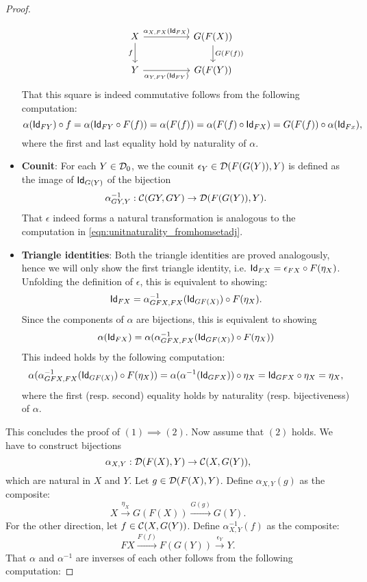 \begin{thm}
\begin{proof}
\begin{itemize}
\[
\begin{tikzcd}
X \arrow[rr, "{\alpha_{X,FX}(\Id[FX])}"] \arrow[d,swap, "f"] && G(F(X)) \arrow[d, "G(F(f))"] \\
Y \arrow[rr, swap, "{\alpha_{Y,FY}(\Id[FY])}"] && G(F(Y))
\end{tikzcd}
\]
That this square is indeed commutative follows from the following computation:
\begin{equation}\label{eqn:unitnaturality_fromhomsetadj}
\co{f}{\alpha(\Id[FY])} = \alpha(\co{F(f)}{\Id[FY]}) = \alpha(F(f)) =  \alpha(\co{\Id[FX]}{F(f)}) = \co{\alpha(\Id[Fx])}{G(F(f))},
\end{equation}
where the first and last equality hold by naturality of $\alpha$.
\item \textbf{Counit}: For each $Y\in\Ob{\DD}$, we the counit $\epsilon_Y \in \CHom{\DD}{F(G(Y))}{Y}$ is defined as the image of $\Id[G(Y)]$ of the bijection
\[
\alpha^{-1}_{GY,Y} : \CHom{\CC}{GY}{GY}\to \CHom{\DD}{F(G(Y))}{Y}.
\]
That $\epsilon$ indeed forms a natural transformation is analogous to the computation in \cref{eqn:unitnaturality_fromhomsetadj}.
\item \textbf{Triangle identities}: Both the triangle identities are proved analogously, hence we will only show the first triangle identity, i.e. $\Id[FX] = \co{F(\eta_X)}{\epsilon_{FX}}$. Unfolding the definition of $\epsilon$, this is equivalent to showing:
\[
\Id[FX] = \co{F(\eta_X)}{\alpha^{-1}_{GFX,FX}(\Id[GF(X)])}.
\]
Since the components of $\alpha$ are bijections, this is equivalent to showing 
\[
\alpha(\Id[FX]) = \alpha(\co{F(\eta_X)}{\alpha^{-1}_{GFX,FX}(\Id[GF(X)])})
\]
This indeed holds by the following computation:
\[
\alpha(\co{F(\eta_X)}{\alpha^{-1}_{GFX,FX}(\Id[GF(X)])}) = \co{\eta_X}{\alpha(\alpha^{-1}(\Id[GFX]))} = \co{\eta_X}{\Id[GFX]} = \eta_X,
\]
where the first (resp. second) equality holds by naturality (resp. bijectiveness) of $\alpha$.
\end{itemize}
This concludes the proof of $(1)\implies (2)$. Now assume that $(2)$ holds. We have to construct bijections
\[
\alpha_{X,Y} : \CHom{\DD}{F(X)}{Y} \to \CHom{\CC}{X}{G(Y)},
\]
which are natural in $X$ and $Y$. Let $g\in \CHom{\DD}{F(X)}{Y}$. Define $\alpha_{X,Y}(g)$ as the composite:
\[
X \xrightarrow{\eta_X} G(F(X)) \xrightarrow{G(g)} G(Y).
\]
For the other direction, let $f\in \CHom{\CC}{X}{G(Y)}$. Define $\alpha^{-1}_{X,Y}(f)$ as the composite:
\[
FX \xrightarrow{F(f)} F(G(Y)) \xrightarrow{\epsilon_Y} Y.
\]
That $\alpha$ and $\alpha^{-1}$ are inverses of each other follows from the following computation:

\end{proof}
\end{thm}
